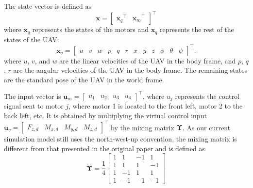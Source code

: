 \documentclass[a4paper,12pt]{article}
\begin{document}
        The state vector is defined as
        \begin{equation}
            \mathbf{x} = \begin{bmatrix}
                {\mathbf{x}_q}^\top & {\mathbf{x}_m}^\top
            \end{bmatrix}^\top
        \end{equation}
        where \(\mathbf{x}_q\) represents the states of the motors and \(\mathbf{x}_q\) represents the rest of the states of the UAV:
        \begin{equation}
            \mathbf{x}_q = \begin{bmatrix} u & v & w & p & q & r & x & y & z & \phi & \theta & \psi \end{bmatrix}^\top .
        \end{equation}
        where \(u\), \(v\), and \(w\) are the linear velocities of the UAV in the body frame, and \(p\), \(q\), \(r\) are the angular velocities of the UAV in the body frame. The remaining states are the standard pose of the UAV in the world frame.

        The input vector is \(\mathbf{u}_m = \begin{bmatrix} u_1 & u_2 & u_3 & u_4 \end{bmatrix}^\top\), where \(u_j\) represents the control signal sent to motor \(j\), where motor 1 is located to the front left, motor 2 to the back left, etc. It is obtained by multiplying the virtual control input \(\mathbf{u}_v = \begin{bmatrix} F_{z,d} & M_{x,d} & M_{y,d}  & M_{z,d} \end{bmatrix}^\top\) by the mixing matrix \(\mathbf{\Upsilon}\). As our current simulation model still uses the north-west-up convention, the mixing matrix is different from that presented in the original paper and is defined as
        \begin{equation}
            \mathbf{\Upsilon} = \frac{1}{4}
            \begin{bmatrix}
                1 &  1 & -1 &  1 \\
                1 &  1 &  1 & -1 \\
                1 & -1 &  1 &  1 \\
                1 & -1 & -1 & -1 
            \end{bmatrix}
        \end{equation}
\end{document}
